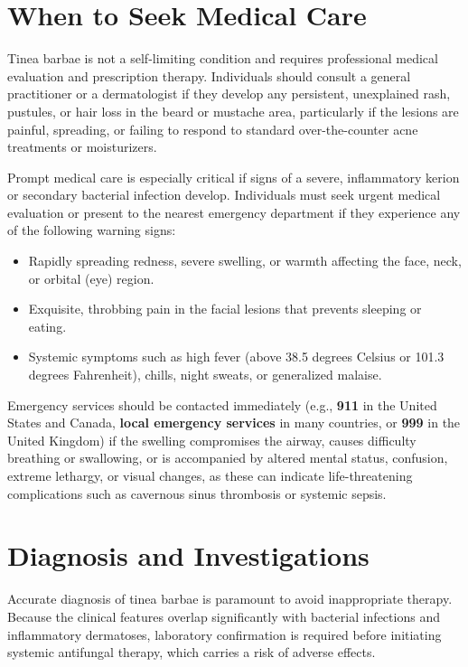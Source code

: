 \section*{When to Seek Medical Care}
Tinea barbae is not a self-limiting condition and requires professional medical evaluation and prescription therapy. Individuals should consult a general practitioner or a dermatologist if they develop any persistent, unexplained rash, pustules, or hair loss in the beard or mustache area, particularly if the lesions are painful, spreading, or failing to respond to standard over-the-counter acne treatments or moisturizers.

Prompt medical care is especially critical if signs of a severe, inflammatory kerion or secondary bacterial infection develop. Individuals must seek urgent medical evaluation or present to the nearest emergency department if they experience any of the following warning signs:
\begin{itemize}
    \item Rapidly spreading redness, severe swelling, or warmth affecting the face, neck, or orbital (eye) region.
    \item Exquisite, throbbing pain in the facial lesions that prevents sleeping or eating.
    \item Systemic symptoms such as high fever (above 38.5 degrees Celsius or 101.3 degrees Fahrenheit), chills, night sweats, or generalized malaise.
\end{itemize}
Emergency services should be contacted immediately (e.g., \textbf{911} in the United States and Canada, \textbf{local emergency services} in many countries, or \textbf{999} in the United Kingdom) if the swelling compromises the airway, causes difficulty breathing or swallowing, or is accompanied by altered mental status, confusion, extreme lethargy, or visual changes, as these can indicate life-threatening complications such as cavernous sinus thrombosis or systemic sepsis.

\section*{Diagnosis and Investigations}
Accurate diagnosis of tinea barbae is paramount to avoid inappropriate therapy. Because the clinical features overlap significantly with bacterial infections and inflammatory dermatoses, laboratory confirmation is required before initiating systemic antifungal therapy, which carries a risk of adverse effects.

